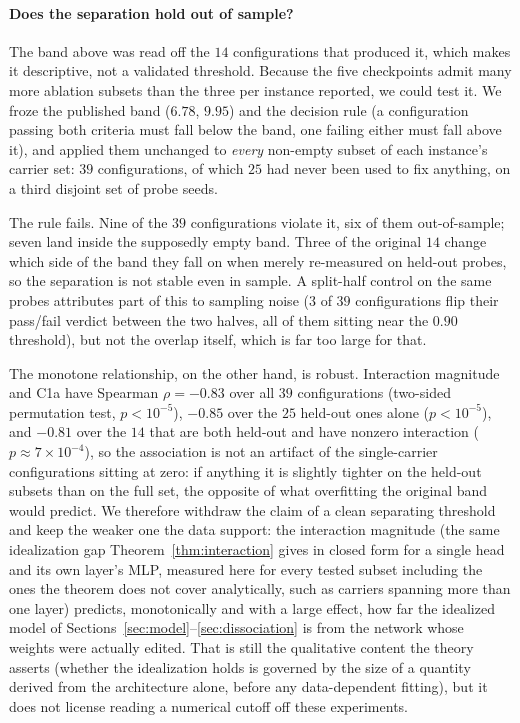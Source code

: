 \documentclass[11pt,a4paper]{article}
\begin{document}
\paragraph{Does the separation hold out of sample?} The band above was read
off the $14$ configurations that produced it, which makes it descriptive, not
a validated threshold. Because the five checkpoints admit many more ablation
subsets than the three per instance reported, we could test it. We froze the
published band ($6.78$, $9.95$) and the decision rule (a configuration
passing both criteria must fall below the band, one failing either must fall
above it), and applied them unchanged to \emph{every} non-empty subset of
each instance's carrier set: $39$ configurations, of which $25$ had never been
used to fix anything, on a third disjoint set of probe seeds.

The rule fails. Nine of the $39$ configurations violate it, six of them
out-of-sample; seven land inside the supposedly empty band. Three of the
original $14$ change which side of the band they fall on when merely
re-measured on held-out probes, so the separation is not stable even in
sample. A split-half control on the same probes attributes part of this to
sampling noise ($3$ of $39$ configurations flip their pass/fail verdict
between the two halves, all of them sitting near the $0.90$ threshold), but
not the overlap itself, which is far too large for that.

The monotone relationship, on the other hand, is robust. Interaction magnitude
and C1a have Spearman $\rho=-0.83$ over all $39$ configurations (two-sided
permutation test, $p<10^{-5}$), $-0.85$ over the $25$ held-out ones alone
($p<10^{-5}$), and $-0.81$ over the $14$ that are both held-out and have
nonzero interaction ($p\approx7\times10^{-4}$), so the association is not an
artifact of the single-carrier configurations sitting at zero: if anything
it is slightly tighter on the held-out subsets than on the full set, the
opposite of what overfitting the original band would predict. We therefore
withdraw the claim of a clean separating threshold and keep the weaker one the
data support: the interaction magnitude (the same idealization gap
Theorem~\ref{thm:interaction} gives in closed form for a single head and its
own layer's MLP, measured here for every tested subset including the ones the
theorem does not cover analytically, such as carriers spanning more than one
layer) predicts, monotonically and with a large effect, how far the
idealized model of Sections~\ref{sec:model}--\ref{sec:dissociation} is from
the network whose weights were actually edited. That is still the qualitative content the theory
asserts (whether the idealization holds is governed by the size of a
quantity derived from the architecture alone, before any data-dependent
fitting), but it does not license reading a numerical cutoff off these
experiments.
\end{document}
